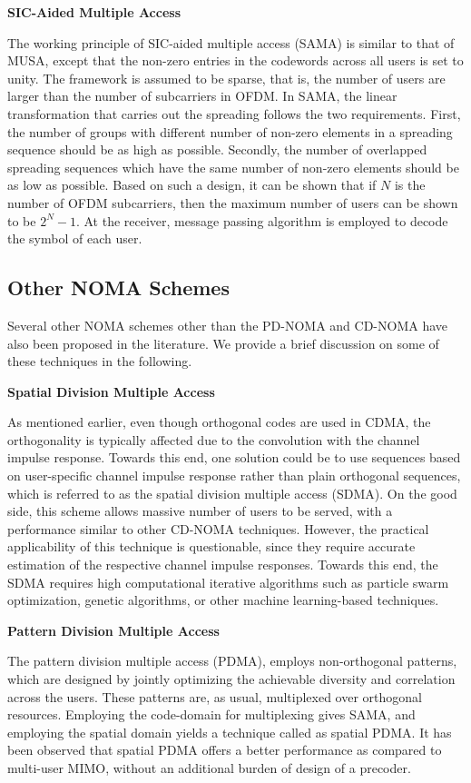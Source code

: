 \begin{multicols}{2}
\smallskip
\noindent
{\bf SIC-Aided Multiple Access}

The working principle of SIC-aided multiple access (SAMA) is similar to that of MUSA, except that the non-zero entries in the codewords across all users is set to unity. The framework is assumed to be sparse, that is, the number of users are larger than the number of subcarriers in OFDM. In SAMA, the linear transformation that carries out the spreading follows the two requirements. First, the number of groups with different number of non-zero elements in a spreading sequence should be as high as possible. Secondly, the number of overlapped spreading sequences which have the same number of non-zero elements should be as low as possible. Based on such a design, it can be shown that if $N$ is the number of OFDM subcarriers, then the maximum number of users can be shown to be $2^N-1$. At the receiver, message passing algorithm is employed to decode the symbol of each user.

\subsection{Other NOMA Schemes}
Several other NOMA schemes other than the PD-NOMA and CD-NOMA have also been proposed in the literature. We provide a brief discussion on some of these techniques in the following.

\smallskip
\noindent
{\bf Spatial Division Multiple Access}


As mentioned earlier, even though orthogonal codes are used in CDMA, the orthogonality is typically affected due to the convolution with the channel impulse response. Towards this end, one solution could be to use sequences based on user-specific channel impulse response rather than plain orthogonal sequences, which is referred to as the spatial division multiple access (SDMA). On the good side, this scheme allows massive number of users to be served, with a performance similar to other CD-NOMA techniques. However, the practical applicability of this technique is questionable, since they require accurate estimation of the respective channel impulse responses. Towards this end, the SDMA requires high computational iterative algorithms such as particle swarm optimization, genetic algorithms, or other machine learning-based techniques. 

\smallskip
\noindent
{\bf Pattern Division Multiple Access}


The pattern division multiple access (PDMA), employs non-orthogonal patterns, which are designed by jointly optimizing the achievable diversity and correlation across the users. These patterns are, as usual, multiplexed over orthogonal resources. Employing the code-domain for multiplexing gives SAMA, and employing the spatial domain yields a technique called as spatial PDMA. It has been observed that spatial PDMA offers a better performance as compared to multi-user MIMO, without an additional burden of design of a precoder.



\end{multicols}
